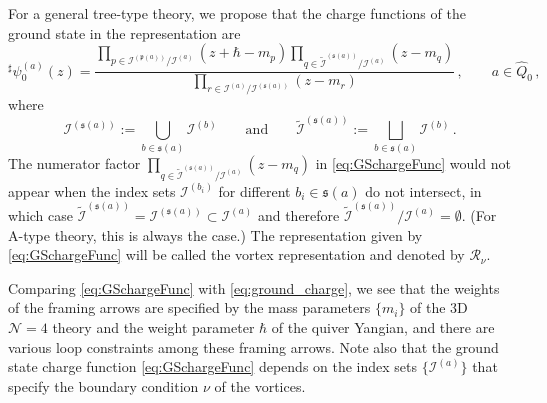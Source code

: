\documentclass[12pt,a4paper]{article}
\renewcommand{\(}{\left(}
\renewcommand{\)}{\right)}
\renewcommand{\(}{\left(}
\renewcommand{\)}{\right)}
\begin{document}
For a general tree-type theory, we propose that the charge functions of the ground state in the representation are 
\begin{equation}\label{eq:GSchargeFunc}
^\sharp\psi^{(a)}_0(z)=\frac{\prod_{p\in \mathcal{I}^{(\mathfrak{p}(a))}/\mathcal{I}^{(a)}} (z+\hbar-m_p) \prod_{q\in \tilde{\mathcal{I}}^{(\mathfrak{s}(a))}/\mathcal{I}^{(a)} }(z-m_q)}{\prod_{r\in \mathcal{I}^{(a)}/\mathcal{I}^{(\mathfrak{s}(a))} }(z-m_r)}\,, \qquad a\in \widehat{Q}_0\,,
\end{equation}
where 
\begin{equation}
\mathcal{I}^{(\mathfrak{s}(a))}:=\bigcup_{b\in \mathfrak{s}(a)}\mathcal{I}^{(b)}
\qquad\textrm{and} \qquad
\tilde{\mathcal{I}}^{(\mathfrak{s}(a))}:=\bigsqcup_{b\in \mathfrak{s}(a)}\mathcal{I}^{(b)}\,.    
\end{equation}
The numerator factor  $\prod_{q\in \tilde{\mathcal{I}}^{(\mathfrak{s}(a))}/\mathcal{I}^{(a)}}(z-m_q)$ in \eqref{eq:GSchargeFunc} would not appear when the index sets $\mathcal{I}^{(b_i)}$ for different $b_i\in\mathfrak{s}(a)$ do not intersect, in which case  $\tilde{\mathcal{I}}^{(\mathfrak{s}(a))}=\mathcal{I}^{(\mathfrak{s}(a))}\subset \mathcal{I}^{(a)}$ and therefore $\tilde{\mathcal{I}}^{(\mathfrak{s}(a))}/\mathcal{I}^{(a)}=\emptyset$.
(For A-type theory, this is always the case.)
The representation given by \eqref{eq:GSchargeFunc} will be called the vortex representation and denoted by $\mathcal{R}_\nu$. 


Comparing \eqref{eq:GSchargeFunc} with \eqref{eq:ground_charge}, we  see that the weights of the framing arrows are specified by the mass parameters $\{m_i\}$ of the 3D $\mathcal{N}=4$ theory and the weight parameter $\hbar$ of the quiver Yangian, and there are various loop constraints among these framing arrows.
Note also that the ground state charge function \eqref{eq:GSchargeFunc} depends on the index sets $\{\mathcal{I}^{(a)}\}$ that specify the boundary condition $\nu$ of the vortices. 

\medskip
\end{document}
